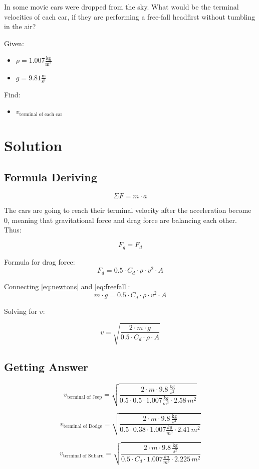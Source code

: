 
In some movie cars were dropped from the sky.
What would be the terminal velocities of each car, if they are
performing a free-fall headfirst without tumbling in the air?

\bigbreak Given:
\begin{itemize}
    \item $ \rho = 1.007 \frac{\text{kg}}{\text{m}^3} $
    \item $ g = 9.81 \frac{\text{m}}{\text{s}^2} $
\end{itemize}

Find:
\begin{itemize}
    \item $ v_{\text{terminal of each car}} $
\end{itemize}


\section*{Solution}
\subsection*{Formula Deriving}

\begin{equation}
    \label{eq:newtons}
    \Sigma F = m \cdot a
\end{equation}

The cars are going to reach their terminal velocity after the acceleration become 0,
meaning that gravitational force and drag force are balancing each other. Thus:

$$ F_g = F_d $$

Formula for drag force:
\begin{equation}
    \label{eq:freefall}
    F_d = 0.5 \cdot C_d \cdot \rho \cdot v^2 \cdot A
\end{equation}

Connecting \ref{eq:newtons} and \ref{eq:freefall}:
$$m \cdot g = 0.5 \cdot C_d \cdot \rho \cdot v^2 \cdot A $$

Solving for $v$:

\begin{equation}
    \label{eq:terminal}
    v = \sqrt{\frac{2 \cdot m \cdot g}{0.5 \cdot C_d \cdot \rho \cdot A}}
\end{equation}

\subsection*{Getting Answer}

$$ v_{\text{terminal of Jeep}} = \sqrt{\frac{2 \cdot m \cdot 9.8 \, \frac{\text{kg}}{s^2}}{0.5 \cdot 0.5 \cdot 1.007 \frac{kg}{m^3} \cdot 2.58 \, m^2}} $$

$$ v_{\text{terminal of Dodge}} = \sqrt{\frac{2 \cdot m \cdot 9.8 \, \frac{\text{kg}}{s^2}}{0.5 \cdot 0.38 \cdot 1.007 \frac{kg}{m^3} \cdot 2.41 \, m^2}} $$

$$ v_{\text{terminal of Subaru}} = \sqrt{\frac{2 \cdot m \cdot 9.8 \, \frac{\text{kg}}{s^2}}{0.5 \cdot C_d \cdot 1.007 \frac{kg}{m^3} \cdot 2.225 \, m^2}} $$